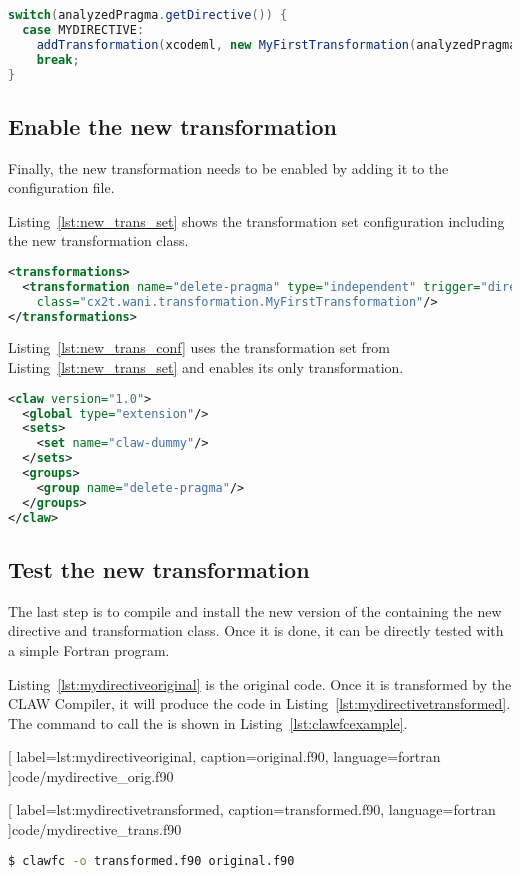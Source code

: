 \begin{lstlisting}[label=lst:categorization, caption=ClawTranslator.java,
  language=java]
switch(analyzedPragma.getDirective()) {
  case MYDIRECTIVE:
    addTransformation(xcodeml, new MyFirstTransformation(analyzedPragma));
    break;
}
\end{lstlisting}


\subsection{Enable the new transformation}
Finally, the new transformation needs to be enabled by adding it to the
configuration file.

Listing~\ref{lst:new_trans_set} shows the transformation set configuration
including the new transformation class.


\begin{lstlisting}[label=lst:new_trans_set, caption=claw-dummy-set.xml, language=xml]
<transformations>
  <transformation name="delete-pragma" type="independent" trigger="directive"
    class="cx2t.wani.transformation.MyFirstTransformation"/>
</transformations>
\end{lstlisting}

Listing~\ref{lst:new_trans_conf} uses the transformation set from
Listing~\ref{lst:new_trans_set} and enables its only transformation.

\begin{lstlisting}[label=lst:new_trans_conf, caption=claw-dummy.xml, language=xml]
<claw version="1.0">
  <global type="extension"/>
  <sets>
    <set name="claw-dummy"/>
  </sets>
  <groups>
    <group name="delete-pragma"/>
  </groups>
</claw>
\end{lstlisting}

\subsection{Test the new transformation}
The last step is to compile and install the new version of the \clawfcomp
containing the new directive and transformation class. Once it is done, it
can be directly tested with a simple Fortran program.

Listing~\ref{lst:mydirectiveoriginal} is the original code. Once it is
transformed by the CLAW Compiler, it will produce the code
in Listing~\ref{lst:mydirectivetransformed}. The command to call
the \clawfcomp is shown in Listing~\ref{lst:clawfcexample}.


  [
    label=lst:mydirectiveoriginal,
    caption=original.f90,
    language=fortran
  ]{code/mydirective_orig.f90}


  [
    label=lst:mydirectivetransformed,
    caption=transformed.f90,
    language=fortran
  ]{code/mydirective_trans.f90}

\begin{lstlisting}[label=lst:clawfcexample, caption=Call the compiler, language=bash]
$ clawfc -o transformed.f90 original.f90
\end{lstlisting}
